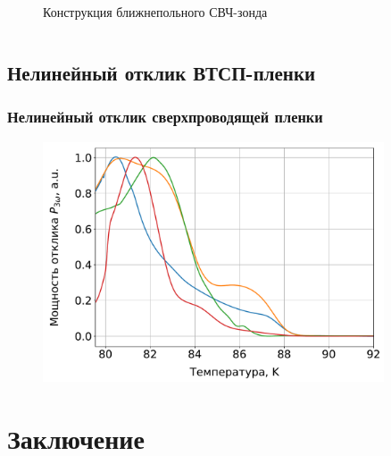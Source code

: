 \begin{frame}[c]
\begin{columns}
\begin{column}{0.49\textwidth}
\begin{figure}[h]
				\caption{Конструкция ближнепольного СВЧ-зонда}
			\end{figure}
		\end{column}
	\end{columns}		
\end{frame}


\subsection{Нелинейный отклик ВТСП-пленки}
\begin{frame}%
	\frametitle{Нелинейный отклик сверхпроводящей пленки}
	\begin{figure}[h]
		\includegraphics[width=0.9\textwidth]{pic/figg}
	\end{figure} 
\end{frame}

\section{Заключение}
